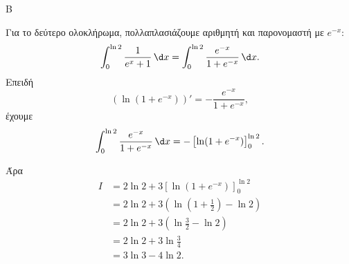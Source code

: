 \begin{thema}{Β}
\begin{erwthma}
Για το δεύτερο ολοκλήρωμα, πολλαπλασιάζουμε αριθμητή και παρονομαστή με $e^{-x}$:
\[
\int_0^{\ln 2}\frac{1}{e^x+1}\,\d x
=\int_0^{\ln 2}\frac{e^{-x}}{1+e^{-x}}\,\d x.
\]
Επειδή
\[
\left(\ln(1+e^{-x})\right)'=-\frac{e^{-x}}{1+e^{-x}},
\]
έχουμε
\[
\int_0^{\ln 2}\frac{e^{-x}}{1+e^{-x}}\,\d x
=-\left[\ln(1+e^{-x})\right]_0^{\ln 2}.
\]

Άρα
\begin{align*}
I
&=2\ln 2+3\left[\ln(1+e^{-x})\right]_0^{\ln 2}\\
&=2\ln 2+3\left(\ln\left(1+\frac{1}{2}\right)-\ln 2\right)\\
&=2\ln 2+3\left(\ln\frac{3}{2}-\ln 2\right)\\
&=2\ln 2+3\ln\frac{3}{4}\\
&=3\ln 3-4\ln 2.
\end{align*}
\end{erwthma}
\end{thema}



